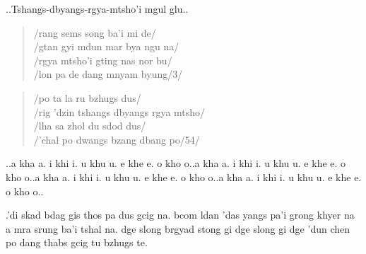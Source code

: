 \documentclass[a4paper,parskip,12pt]{scrarticle}
\begin{document}
\begin{otherlanguage}{wylie}
  ..Tshangs-dbyangs-rgya-mtsho'i mgul glu..
  \begin{verse}
    /rang sems song ba'i mi de/\\
    /gtan gyi mdun mar bya ngu na/\\
    /rgya mtsho'i gting nas nor bu/\\
    /lon pa de dang mnyam byung/3/
  \end{verse}
  \begin{verse}
    /po ta la ru bzhugs dus/\\
    /rig 'dzin tshangs dbyangs rgya mtsho/\\
    /lha sa zhol du sdod dus/\\
    /'chal po dwangs bzang dbang po/54/
  \end{verse}
  \bigskip
  ..a kha a. i khi i. u khu u. e khe e. o kho o..a kha a. i khi i. u khu u. e khe e. o kho o..a kha a. i khi i. u khu u. e khe e. o kho o..a kha a. i khi i. u khu u. e khe e. o kho o..

  .’di skad bdag gis thos pa dus gcig na.
  bcom ldan ’das yangs pa’i grong khyer na a mra srung ba’i tshal na.
  dge slong brgyad stong gi dge slong gi dge ’dun chen po dang thabs gcig tu bzhugs te.
\end{otherlanguage}
\end{document}
